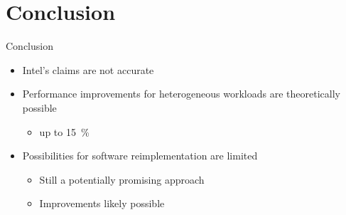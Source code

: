 \section{Conclusion}
\begin{frame}[t]{Conclusion}
	\begin{itemize}
		\item Intel's claims are not accurate
		\item Performance improvements for heterogeneous workloads are theoretically possible
		\begin{itemize}
			\item up to \SI{15}{\percent}
		\end{itemize}
		\item Possibilities for software reimplementation are limited
		\begin{itemize}
			\item Still a potentially promising approach
			\item Improvements likely possible
		\end{itemize}
	\end{itemize}
\end{frame}